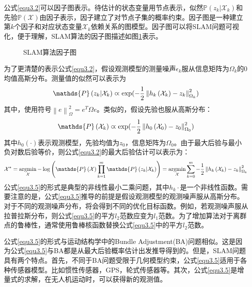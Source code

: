 公式\eqref{equ3.2}可以因子图表示。待估计的状态变量用节点表示，似然$\mathds{P}\left(z_k \vert \mathcal{X}_k  \right)$和先验$\mathds{P}\left(\mathcal{X} \right)$由因子表示，因子建立了对节点子集的概率约束。因子图是一种建立第$k$个因子和对应状态变量$\mathcal{X}_k$依赖关系的图模型。因子图可以将SLAM问题可视化，便于理解，SLAM算法的因子图描述如图\ref{fig3.3}表示。
\begin{figure}
\centering
\caption{SLAM算法因子图}
\label{fig3.3}
\end{figure}



为了更清楚的表示公式\eqref{equ3.2}，假设观测模型的测量噪声$\epsilon_k$服从信息矩阵为$\Omega_k$的0均值高斯分布。测量值的似然可以表示为
\begin{equation}
\label{equ3.3}
\mathds{P}\left(z_k \vert \mathcal{X}_k  \right) \varpropto \exp ( -{1 \over 2} \left\| h_k\left( \mathcal{X}_k \right) - z_k \right\|_{\Omega_k}^2 )
\end{equation}
其中，使用符号$\left\| e \right\|_{\Omega}^2 = e^T \Omega e$。类似的，假设先验也服从高斯分布：
\begin{equation}
\label{equ3.4}
\mathds{P}\left( \mathcal{X}_k  \right) \varpropto \exp ( -{1 \over 2} \left\| h_0\left( \mathcal{X}_0 \right) - z_0 \right\|_{\Omega_0}^2 )
\end{equation}
其中$h_0(\cdot)$表示观测模型，先验均值为$z_0$，信息矩阵为$\Omega_0$。由于最大后验与最小负对数后验等价，则公式\eqref{equ3.2}的最大后验估计可以表示为：
\begin{equation}
\label{equ3.5}
\mathcal{X}^* 
=
\argmin \limits_{\mathcal{X}} - \log \left( \mathds{P}\left(\mathcal{X}\right) \prod \limits_{k=1}^{m} \mathds{P}\left(z_k \vert \mathcal{X}_k  \right) \right)
=
\argmin \limits_{\mathcal{X}} \sum \limits_{k=0}^{m} -{1 \over 2} \left\| h_k\left( \mathcal{X}_k \right) - z_k \right\|_{\Omega_k}^2
\end{equation}
公式\eqref{equ3.5}的形式是典型的非线性最小二乘问题，其中$h_k{\cdot}$是一个非线性函数。需要注意的是，公式\eqref{equ3.5}推导的前提是假设观测模型的观测噪声服从高斯分布。对于不同的观测噪声分布，将会得到不同的优化目标函数。例如，若观测噪声服从拉普拉斯分布，则公式\eqref{equ3.5}的平方$l_2$范数应变为$l_1$范数。为了增加算法对于离群点的鲁棒性，通常使用鲁棒核函数替换公式\eqref{equ3.5}中的平方$l_2$范数。

公式\eqref{equ3.5}的形式与运动结构学中的Bundle Adjustment(BA)问题相似。这是因为公式\eqref{equ3.5}与BA都是从最大后验概率估计出发推导得到的。但是，SLAM问题具有两个特点。首先，不同于BA问题受限于几何模型约束，公式\eqref{equ3.5}适用于各种传感器模型。比如惯性传感器，GPS，轮式传感器等。其次，公式\eqref{equ3.5}是增量式的求解，在无人机运动时，可以获得新的观测值。


